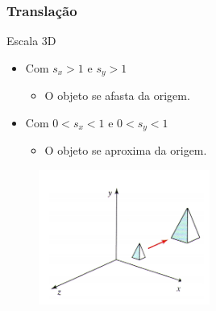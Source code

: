 \documentclass{beamer}
\begin{document}
\begin{frame}
\frametitle{Translação}

	\begin{block}{Escala 3D}
		\begin{itemize}
			\item Com $s_x > 1$ e $s_y > 1$
				\begin{itemize}
					\item O objeto se afasta da origem.
				\end{itemize}
				
			\item Com $ 0 <s_x < 1$ e $ 0 < s_y < 1$
				\begin{itemize}
					\item O objeto se aproxima da origem.
				\end{itemize}
		\end{itemize}
	\end{block}


	\begin{figure}[!h]
			\begin{center}
			\includegraphics[width=0.5\textwidth]{Figures/Escala3D}
			\end{center}
	\end{figure}	
\end{frame}
\end{document}
